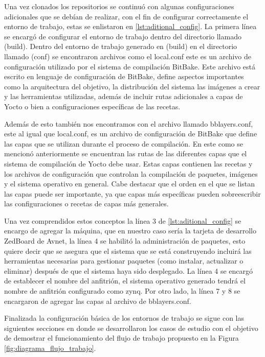 Una vez clonados los repositorios se continuó con algunas configuraciones adicionales que se debían de realizar, con el fin de configurar correctamente el entorno de trabajo, estas se enlistaron en \ref{lst:aditional_config}. La primera línea se encargó de configurar el entorno de trabajo dentro del directorio llamado (build). Dentro del entorno de trabajo generado en (build) en el directorio llamado (conf) se encontraron archivos como el local.conf este es un archivo de configuración utilizado por el sistema de compilación BitBake. Este archivo está escrito en lenguaje de configuración de BitBake, define aspectos importantes como la arquitectura del objetivo, la distribución del sistema las imágenes a crear y las herramientas utilizadas, además de incluir rutas adicionales a capas de Yocto o bien a configuraciones específicas de las recetas. 

Además de esto también nos encontramos con el archivo llamado bblayers.conf, este al igual que local.conf, es un archivo de configuración de BitBake que define las capas que se utilizan durante el proceso de compilación. En este como se mencionó anteriormente se encuentran las rutas de las diferentes capas que el sistema de compilación de Yocto debe usar. Estas capas contienen las recetas y los archivos de configuración que controlan la compilación de paquetes, imágenes y el sistema operativo en general. Cabe destacar que el orden en el que se listan las capas puede ser importante, ya que capas más específicas pueden sobreescribir las configuraciones o recetas de capas más generales.

Una vez comprendidos estos conceptos la línea 3 de \ref{lst:aditional_config} se encargo de agregar la máquina, que en nuestro caso sería la tarjeta de desarrollo ZedBoard de Avnet, la línea 4 se habilitó la administración de paquetes, esto quiere decir que se asegura que el sistema que se está construyendo incluirá las herramientas necesarias para gestionar paquetes (como instalar, actualizar o eliminar) después de que el sistema haya sido desplegado. La línea 4 se encargó de establecer el nombre del anfitrión, el sistema operativo generado tendrá el nombre de anfitrión configurado como zynq. Por otro lado, la línea 7 y 8 se encargaron de agregar las capas al archivo de bblayers.conf.

Finalizada la configuración básica de los entornos de trabajo se sigue con las siguientes secciones en donde se desarrollaron los casos de estudio con el objetivo de demostrar el funcionamiento del flujo de trabajo propuesto en la Figura \ref{fig:diagrama_flujo_trabajo}.

